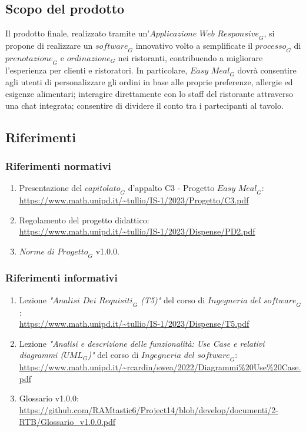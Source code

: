 \documentclass[12pt, oneside]{article}
\begin{document}
\subsection{Scopo del prodotto}
Il prodotto finale, realizzato tramite un'$\textit{Applicazione Web Responsive}_G$, si propone di realizzare un $\textit{software}_G$ innovativo volto a semplificate il $\textit{processo}_G$ di $\textit{prenotazione}_G$ e $\textit{ordinazione}_G$ nei ristoranti, contribuendo a migliorare l'esperienza per clienti e ristoratori. In particolare, $\textit{Easy Meal}_G$ dovrà consentire agli utenti di personalizzare gli ordini in base alle proprie preferenze, allergie ed esigenze alimentari; interagire direttamente con lo staff del ristorante attraverso una chat integrata; consentire di dividere il conto tra i partecipanti al tavolo.
\subsection{Riferimenti}
\subsubsection{Riferimenti normativi}
\begin{enumerate}
    \item Presentazione del $\textit{capitolato}_G$ d'appalto C3 - Progetto $\textit{Easy Meal}_G$: \\ \url{https://www.math.unipd.it/~tullio/IS-1/2023/Progetto/C3.pdf}
    \item Regolamento del progetto didattico: \\ \url{https://www.math.unipd.it/~tullio/IS-1/2023/Dispense/PD2.pdf}
    \item $\textit{Norme di Progetto}_G$ v1.0.0.
\end{enumerate}
\subsubsection{Riferimenti informativi}
\begin{enumerate}
    \item Lezione \emph{"$\textit{Analisi Dei Requisiti}_G$ (T5)"} del corso di $\textit{Ingegneria del software}_G$: \\ \url{https://www.math.unipd.it/~tullio/IS-1/2023/Dispense/T5.pdf}
    \item Lezione \emph{"Analisi e descrizione delle funzionalità: Use Case e relativi diagrammi ($\textit{UML}_G$)"} del corso di $\textit{Ingegneria del software}_G$: \\ \url{https://www.math.unipd.it/~rcardin/swea/2022/Diagrammi%20Use%20Case.pdf}
    \item Glossario v1.0.0: \\
    \url{https://github.com/RAMtastic6/Project14/blob/develop/documenti/2-RTB/Glossario_v1.0.0.pdf}
\end{enumerate}
\newpage
\end{document}
